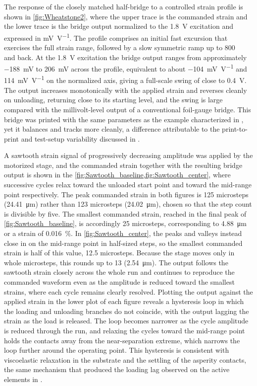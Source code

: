 The response of the closely matched half-bridge to a controlled strain profile is shown in \cref{fig:Wheatstone2}, where the upper trace is the commanded strain and the lower trace is the bridge output normalized to the \SI{1.8}{\volt} excitation and expressed in \si{\milli\volt\per\volt}. The profile comprises an initial fast excursion that exercises the full strain range, followed by a slow symmetric ramp up to \SI{800}{\micro\strain} and back. At the \SI{1.8}{\volt} excitation the bridge output ranges from approximately \SI{-188}{\milli\volt} to \SI{206}{\milli\volt} across the profile, equivalent to about \SI{-104}{\milli\volt\per\volt} and \SI{114}{\milli\volt\per\volt} on the normalized axis, giving a full-scale swing of close to \SI{0.4}{\volt}. The output increases monotonically with the applied strain and reverses cleanly on unloading, returning close to its starting level, and the swing is large compared with the millivolt-level output of a conventional foil-gauge bridge. This bridge was printed with the same parameters as the example characterized in , yet it balances and tracks more cleanly, a difference attributable to the print-to-print and test-setup variability discussed in .

A sawtooth strain signal of progressively decreasing amplitude was applied by the motorized stage, and the commanded strain together with the resulting bridge output is shown in the \cref{fig:Sawtooth_baseline,fig:Sawtooth_center}, where successive cycles relax toward the unloaded start point and toward the mid-range point respectively. 
The peak commanded strain in both figures is \num{125} microsteps (\SI{24.41}{\micro\meter}) rather than \num{123} microsteps (\SI{24.02}{\micro\meter}), chosen so that the step count is divisible by five. The smallest commanded strain, reached in the final peak of \cref{fig:Sawtooth_baseline}, is accordingly \num{25} microsteps, corresponding to \SI{4.88}{\micro\meter} or a strain of \SI{0.016}{\percent}.
In \cref{fig:Sawtooth_center}, the peaks and valleys instead close in on the mid-range point in half-sized steps, so the smallest commanded strain is half of this value, \num{12.5} microsteps. Because the stage moves only in whole microsteps, this rounds up to \num{13} (\SI{2.54}{\micro\meter}).
The output follows the sawtooth strain closely across the whole run and continues to reproduce the commanded waveform even as the amplitude is reduced toward the smallest strains, where each cycle remains clearly resolved. Plotting the output against the applied strain in the lower plot of each figure reveals a hysteresis loop in which the loading and unloading branches do not coincide, with the output lagging the strain as the load is released. The loop becomes narrower as the cycle amplitude is reduced through the run, and relaxing the cycles toward the mid-range point holds the contacts away from the near-separation extreme, which narrows the loop further around the operating point. This hysteresis is consistent with viscoelastic relaxation in the substrate and the settling of the asperity contacts, the same mechanism that produced the loading lag observed on the active elements in .


